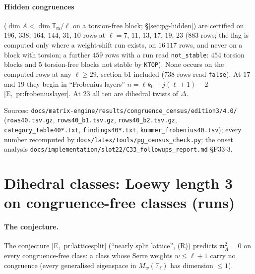 \documentclass[11pt]{article}
\newcommand{\Fl}{\mathbb{F}_\ell}
\newcommand{\T}{\mathbb{T}}
\newcommand{\m}{\mathfrak{m}}
\newcommand{\code}[1]{\texttt{#1}}
\newcommand{\file}[1]{\texttt{#1}}
\newcommand{\pfile}[1]{\nolinkurl{#1}}
\begin{document}
\paragraph{Hidden congruences} ($\dim A<\dim\T_\m/\ell$ on a torsion-free block; \S\ref{sec:pg-hidden}) are certified on $196$, $338$, $164$,
$144$, $31$, $10$ rows at $\ell=7$, $11$, $13$, $17$, $19$, $23$ ($883$ rows; the flag is computed only where a weight-shift run exists, on
$16\,117$ rows, and never on a block with torsion; a further $459$ rows with a run read \code{not\_stable}: $454$ torsion blocks and $5$ torsion-free blocks not stable by \code{KTOP}). None occurs on the computed rows at any $\ell\ge29$, section b1 included ($738$ rows read
\code{false}). At $17$ and $19$ they begin in ``Frobenius layers'' $n=\ell k_0+j(\ell+1)-2$ [E,~pr:frobeniuslayer]. At $23$ all ten are
dihedral twists of $\Delta$.

\noindent Sources: \pfile{docs/matrix-engine/results/congruence_census/edition3/4.0/} (\pfile{rows40.tsv.gz}, \pfile{rows40_b1.tsv.gz},
\pfile{rows40_b2.tsv.gz}, \pfile{category_table40*.txt}, \pfile{findings40*.txt}, \pfile{kummer_frobenius40.tsv}); every number recomputed by
\file{docs/latex/tools/pg\_census\_check.py}; the onset analysis \pfile{docs/implementation/slot22/C33_followups_report.md} \S F33-3.

\section{Dihedral classes: Loewy length 3 on congruence-free classes (runs)}\label{sec:pg-dihedral3}

\paragraph{The conjecture.} The conjecture [E,~pr:latticesplit] (``nearly split lattice'', (R)) predicts $\m_A^{2}=0$ on every congruence-free
class: a class whose Serre weights $w\le\ell+1$ carry no congruence (every generalised eigenspace in $M_w(\Fl)$ has dimension $\le1$).
\end{document}

